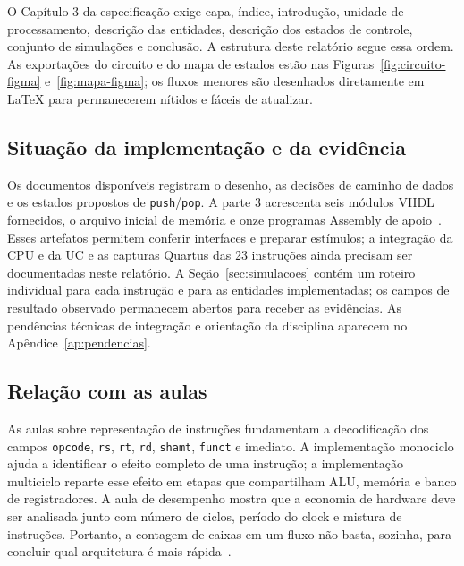 O Capítulo 3 da especificação exige capa, índice, introdução, unidade de processamento, descrição das entidades, descrição dos estados de controle, conjunto de simulações e conclusão. A estrutura deste relatório segue essa ordem. As exportações do circuito e do mapa de estados estão nas Figuras~\ref{fig:circuito-figma} e~\ref{fig:mapa-figma}; os fluxos menores são desenhados diretamente em LaTeX para permanecerem nítidos e fáceis de atualizar.

\subsection{Situação da implementação e da evidência}\label{subsec:situacao}

Os documentos disponíveis registram o desenho, as decisões de caminho de dados e os estados propostos de \texttt{push}/\texttt{pop}. A parte 3 acrescenta seis módulos VHDL fornecidos, o arquivo inicial de memória e onze programas Assembly de apoio~\cite{docpt3}. Esses artefatos permitem conferir interfaces e preparar estímulos; a integração da CPU e da UC e as capturas Quartus das 23 instruções ainda precisam ser documentadas neste relatório. A Seção~\ref{sec:simulacoes} contém um roteiro individual para cada instrução e para as entidades implementadas; os campos de resultado observado permanecem abertos para receber as evidências. As pendências técnicas de integração e orientação da disciplina aparecem no Apêndice~\ref{ap:pendencias}.

\subsection{Relação com as aulas}\label{subsec:aulas}

As aulas sobre representação de instruções fundamentam a decodificação dos campos \texttt{opcode}, \texttt{rs}, \texttt{rt}, \texttt{rd}, \texttt{shamt}, \texttt{funct} e imediato. A implementação monociclo ajuda a identificar o efeito completo de uma instrução; a implementação multiciclo reparte esse efeito em etapas que compartilham ALU, memória e banco de registradores. A aula de desempenho mostra que a economia de hardware deve ser analisada junto com número de ciclos, período do clock e mistura de instruções. Portanto, a contagem de caixas em um fluxo não basta, sozinha, para concluir qual arquitetura é mais rápida~\cite{aulas}.
